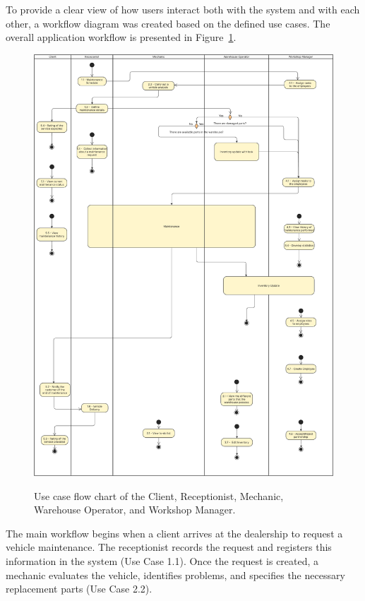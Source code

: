 To provide a clear view of how users interact both with the system and with each other, a workflow diagram was created based on the defined use cases. The overall application workflow is presented in Figure~\ref{fig:appWorkflow}.

\begin{figure}[h]
  \caption{Use case flow chart of the Client, Receptionist, Mechanic, Warehouse Operator, and Workshop Manager.}
  \centering
  \includegraphics[width=\textwidth]{figs/UseCaseDiagram - General}
  \label{fig:appWorkflow}
\end{figure}

The main workflow begins when a client arrives at the dealership to request a vehicle maintenance. The receptionist records the request and registers this information in the system (Use Case 1.1). Once the request is created, a mechanic evaluates the vehicle, identifies problems, and specifies the necessary replacement parts (Use Case 2.2).

